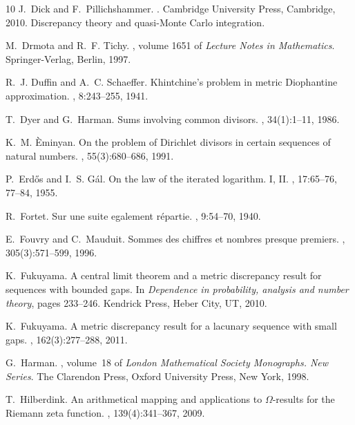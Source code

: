 \documentclass[12pt]{amsart}
\begin{document}
\begin{thebibliography}{10}
J.~Dick and F.~Pillichshammer.
.
\newblock Cambridge University Press, Cambridge, 2010.
\newblock Discrepancy theory and quasi-Monte Carlo integration.

M.~Drmota and R.~F. Tichy.
, volume 1651 of {\em
  Lecture Notes in Mathematics}.
\newblock Springer-Verlag, Berlin, 1997.

R.~J. Duffin and A.~C. Schaeffer.
\newblock Khintchine's problem in metric {D}iophantine approximation.
, 8:243--255, 1941.

T.~Dyer and G.~Harman.
\newblock Sums involving common divisors.
, 34(1):1--11, 1986.

K.~M. {\`E}minyan.
\newblock On the problem of {D}irichlet divisors in certain sequences of
  natural numbers.
, 55(3):680--686, 1991.

P.~Erd{\H{o}}s and I.~S. G{\'a}l.
\newblock On the law of the iterated logarithm. {I}, {II}.
,
  17:65--76, 77--84, 1955.

R.~Fortet.
\newblock Sur une suite egalement r\'epartie.
, 9:54--70, 1940.

E.~Fouvry and C.~Mauduit.
\newblock Sommes des chiffres et nombres presque premiers.
, 305(3):571--599, 1996.

K.~Fukuyama.
\newblock A central limit theorem and a metric discrepancy result for sequences
  with bounded gaps.
\newblock In {\em Dependence in probability, analysis and number theory}, pages
  233--246. Kendrick Press, Heber City, UT, 2010.

K.~Fukuyama.
\newblock A metric discrepancy result for a lacunary sequence with small gaps.
, 162(3):277--288, 2011.

G.~Harman.
, volume~18 of {\em London Mathematical
  Society Monographs. New Series}.
\newblock The Clarendon Press, Oxford University Press, New York, 1998.

T.~Hilberdink.
\newblock An arithmetical mapping and applications to {$\Omega$}-results for
  the {R}iemann zeta function.
, 139(4):341--367, 2009.


\end{thebibliography}
\end{document}
